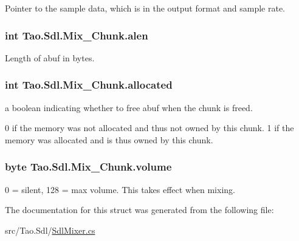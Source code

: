Pointer to the sample data, which is in the output format and sample rate. 

\hypertarget{struct_tao_1_1_sdl_1_1_mix___chunk_a0bdd5e8412efa97d4dbc738895fb0ffc}{
\subsubsection[{alen}]{\setlength{\rightskip}{0pt plus 5cm}int {\bf Tao.Sdl.Mix\_\-Chunk.alen}}}
\label{struct_tao_1_1_sdl_1_1_mix___chunk_a0bdd5e8412efa97d4dbc738895fb0ffc}


Length of abuf in bytes. 

\hypertarget{struct_tao_1_1_sdl_1_1_mix___chunk_a309fd05e984280194e82869ab43f26c4}{
\subsubsection[{allocated}]{\setlength{\rightskip}{0pt plus 5cm}int {\bf Tao.Sdl.Mix\_\-Chunk.allocated}}}
\label{struct_tao_1_1_sdl_1_1_mix___chunk_a309fd05e984280194e82869ab43f26c4}


a boolean indicating whether to free abuf when the chunk is freed. 

0 if the memory was not allocated and thus not owned by this chunk. 1 if the memory was allocated and is thus owned by this chunk. \hypertarget{struct_tao_1_1_sdl_1_1_mix___chunk_a1c9afa49eba69be215d4ce2cfebb982a}{
\subsubsection[{volume}]{\setlength{\rightskip}{0pt plus 5cm}byte {\bf Tao.Sdl.Mix\_\-Chunk.volume}}}
\label{struct_tao_1_1_sdl_1_1_mix___chunk_a1c9afa49eba69be215d4ce2cfebb982a}


0 = silent, 128 = max volume. This takes effect when mixing. 



The documentation for this struct was generated from the following file:\begin{DoxyCompactItemize}
\item 
src/Tao.Sdl/\hyperlink{_sdl_mixer_8cs}{SdlMixer.cs}\end{DoxyCompactItemize}
